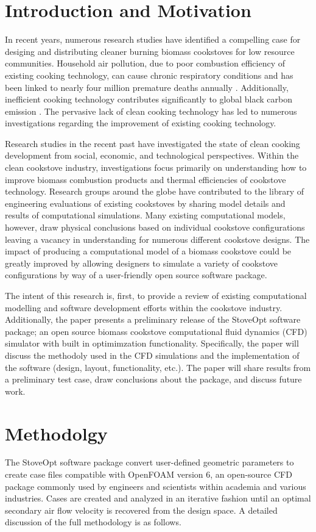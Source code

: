 \documentclass[3p,times,twocolumn]{elsarticle}
\begin{document}
\section{Introduction and Motivation}
In recent years, numerous research studies have identified a compelling case for desiging and distributing cleaner burning biomass cookstoves for low resource communities. Household air pollution, due to poor combustion efficiency of existing cooking technology, can cause chronic respiratory conditions and has been linked to nearly four million premature deaths annually \cite{Nordica}. Additionally, inefficient cooking technology contributes significantly to global black carbon emission \cite{Bond}. The pervasive lack of clean cooking technology has led to numerous investigations regarding the improvement of existing cooking technology.

Research studies in the recent past have investigated the state of clean cooking development from social, economic, and technological perspectives. Within the clean cookstove industry, investigations focus primarily on understanding how to improve biomass combustion products and thermal efficiencies of cookstove technology. Research groups around the globe have contributed to the library of engineering evaluations of existing cookstoves by sharing model details and results of computational simulations. Many existing computational models, however, draw physical conclusions based on individual cookstove configurations leaving a vacancy in understanding for numerous different cookstove designs. The impact of producing a computational model of a biomass cookstove could be greatly improved by allowing designers to simulate a variety of cookstove configurations by way of a user-friendly open source software package. 

The intent of this research is, first, to provide a review of existing computational modelling and software development efforts within the cookstove industry. Additionally, the paper presents a preliminary release of the StoveOpt \cite{Liam} software package; an open source biomass cookstove computational fluid dynamics (CFD) simulator with built in optimimzation functionality. Specifically, the paper will discuss the methodoly used in the CFD simulations and the implementation of the software (design, layout, functionality, etc.). The paper will share results from a preliminary test case, draw conclusions about the package, and discuss future work.

\section{Methodolgy}
The StoveOpt software package convert user-defined geometric parameters to create case files compatible with OpenFOAM version 6, an open-source CFD package commonly used by engineers and scientists within academia and various industries. Cases are created and analyzed in an iterative fashion until an optimal secondary air flow velocity is recovered from the design space. A detailed discussion of the full methodology is as follows.   
\end{document}
